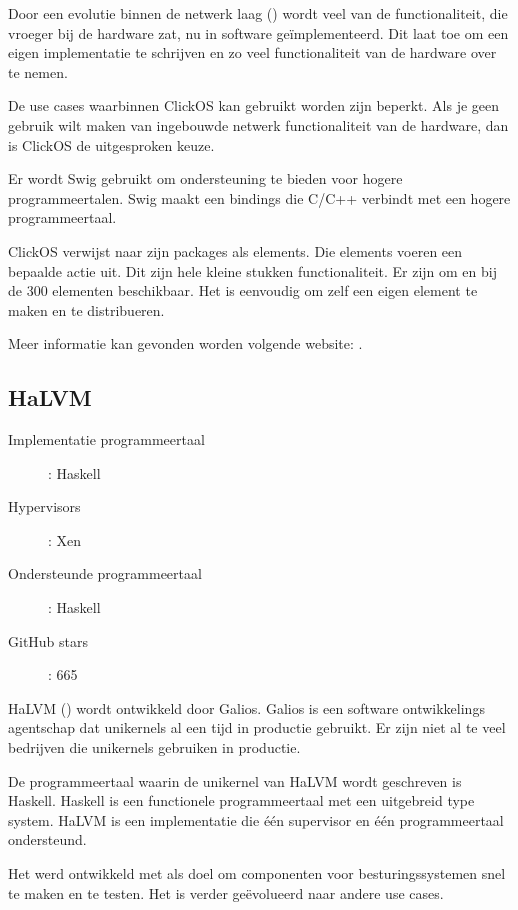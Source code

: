 Door een evolutie binnen de netwerk laag (\cite{garcia_villalba_trends_2015}) wordt veel van de functionaliteit, die vroeger bij de hardware zat, nu in software geïmplementeerd. Dit laat toe om een eigen implementatie te schrijven en zo veel functionaliteit van de hardware over te nemen.

De use cases waarbinnen ClickOS kan gebruikt worden zijn beperkt. Als je geen gebruik wilt maken van ingebouwde netwerk functionaliteit van de hardware, dan is ClickOS de uitgesproken keuze.

Er wordt Swig gebruikt om ondersteuning te bieden voor hogere programmeertalen. Swig maakt een bindings die C/C++ verbindt met een hogere programmeertaal.

ClickOS verwijst naar zijn packages als elements. Die elements voeren een bepaalde actie uit. Dit zijn hele kleine stukken functionaliteit. Er zijn om en bij de 300 elementen beschikbaar. Het is eenvoudig om zelf een eigen element te maken en te distribueren.

Meer informatie kan gevonden worden volgende website: \cite{cloud_networking_performance_lab_cloud_????}.

\subsection{HaLVM}

\begin{description}
  \item [Implementatie programmeertaal]: Haskell
  \item [Hypervisors]: Xen
  \item [Ondersteunde programmeertaal]: Haskell
  \item [GitHub stars]: 665
\end{description}

HaLVM (\cite{galois_inc._haskell_????}) wordt ontwikkeld door Galios. Galios is een software ontwikkelings agentschap dat unikernels al een tijd in productie gebruikt.
Er zijn niet al te veel bedrijven die unikernels gebruiken in productie.

De programmeertaal waarin de unikernel van HaLVM wordt geschreven is Haskell. Haskell is een functionele programmeertaal met een uitgebreid type system. HaLVM is een implementatie die één supervisor en één programmeertaal ondersteund.

Het werd ontwikkeld met als doel om componenten voor besturingssystemen snel te maken en te testen. Het is verder geëvolueerd naar andere use cases.

